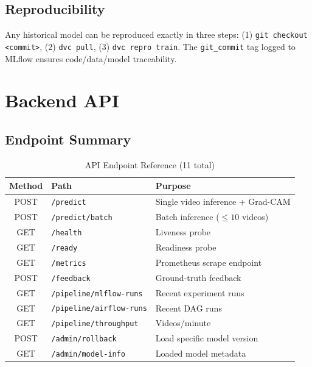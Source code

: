 \documentclass[conference]{IEEEtran}
\begin{document}
\subsection{Reproducibility}

Any historical model can be reproduced exactly in three steps: (1) \texttt{git checkout <commit>}, (2) \texttt{dvc pull}, (3) \texttt{dvc repro train}. The \texttt{git\_commit} tag logged to MLflow ensures code/data/model traceability.

\section{Backend API}
\label{sec:api}

\subsection{Endpoint Summary}

\begin{table}[H]
\centering
\caption{API Endpoint Reference (11 total)}
\label{tab:endpoints}
\begin{tabular}{@{}clL{4cm}@{}}
\toprule
\textbf{Method} & \textbf{Path} & \textbf{Purpose} \\
\midrule
POST & \texttt{/predict}               & Single video inference + Grad-CAM \\
POST & \texttt{/predict/batch}         & Batch inference ($\leq 10$ videos) \\
GET  & \texttt{/health}                & Liveness probe \\
GET  & \texttt{/ready}                 & Readiness probe \\
GET  & \texttt{/metrics}               & Prometheus scrape endpoint \\
POST & \texttt{/feedback}              & Ground-truth feedback \\
GET  & \texttt{/pipeline/mlflow-runs}  & Recent experiment runs \\
GET  & \texttt{/pipeline/airflow-runs} & Recent DAG runs \\
GET  & \texttt{/pipeline/throughput}   & Videos/minute \\
POST & \texttt{/admin/rollback}        & Load specific model version \\
GET  & \texttt{/admin/model-info}      & Loaded model metadata \\
\bottomrule
\end{tabular}
\end{table}
\end{document}
